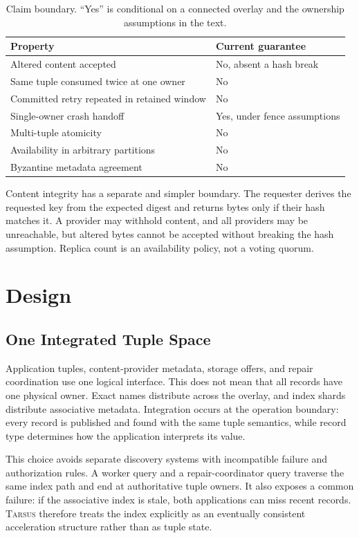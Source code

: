 \documentclass[conference]{IEEEtran}
\newcommand{\system}{\textsc{Tarsus}\xspace}
\begin{document}
\begin{table}[t]
\caption{Claim boundary. ``Yes'' is conditional on a connected overlay and
the ownership assumptions in the text.}
\label{tab:claims}
\centering
\begin{tabular}{@{}p{}p{}@{}}
\toprule
Property & Current guarantee \\
\midrule
Altered content accepted & No, absent a hash break \\
Same tuple consumed twice at one owner & No \\
Committed retry repeated in retained window & No \\
Single-owner crash handoff & Yes, under fence assumptions \\
Multi-tuple atomicity & No \\
Availability in arbitrary partitions & No \\
Byzantine metadata agreement & No \\
\bottomrule
\end{tabular}
\end{table}

Content integrity has a separate and simpler boundary. The requester derives
the requested key from the expected digest and returns bytes only if their hash
matches it. A provider may withhold content, and all providers may be
unreachable, but altered bytes cannot be accepted without breaking the hash
assumption. Replica count is an availability policy, not a voting quorum.

\section{Design}
\label{sec:design}

\subsection{One Integrated Tuple Space}

Application tuples, content-provider metadata, storage offers, and repair
coordination use one logical interface. This does not mean that all records
have one physical owner. Exact names distribute across the overlay, and index
shards distribute associative metadata. Integration occurs at the operation
boundary: every record is published and found with the same tuple semantics,
while record type determines how the application interprets its value.

This choice avoids separate discovery systems with incompatible failure and
authorization rules. A worker query and a repair-coordinator query traverse the
same index path and end at authoritative tuple owners. It also exposes a common
failure: if the associative index is stale, both applications can miss recent
records. \system therefore treats the index explicitly as an eventually
consistent acceleration structure rather than as tuple state.
\end{document}
